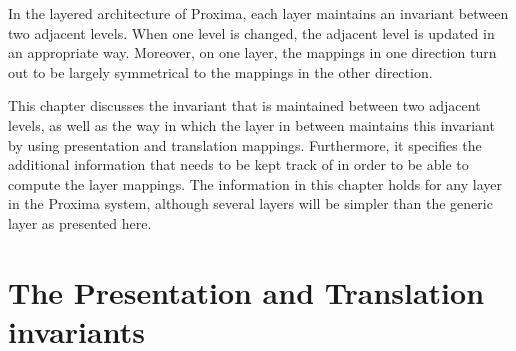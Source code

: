 


In the layered architecture of Proxima, each layer maintains an invariant between two adjacent levels. When one level is changed, the adjacent level is updated in an appropriate way. Moreover, on one layer, the mappings in one direction turn out to be largely symmetrical to the mappings in the other direction.

This chapter discusses the invariant that is maintained between two adjacent levels, as well as the way in which the layer in between maintains this invariant by using presentation and translation mappings. Furthermore, it specifies the additional information that needs to be kept track of in order to be able to compute the layer mappings. The information in this chapter holds for any layer in the Proxima system, although several layers will be simpler than the generic layer as presented here.





%										
%										
\section{The Presentation and Translation invariants}



